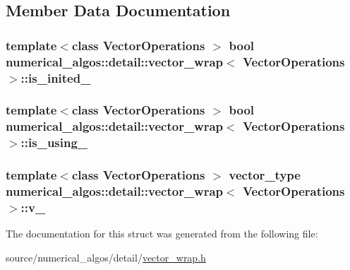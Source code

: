 \subsection{Member Data Documentation}
\hypertarget{structnumerical__algos_1_1detail_1_1vector__wrap_aaf5db6668aeed52bebc8e9679a07be72}{
\subsubsection[{is\-\_\-inited\-\_\-}]{\setlength{\rightskip}{0pt plus 5cm}template$<$class Vector\-Operations $>$ bool {\bf numerical\-\_\-algos\-::detail\-::vector\-\_\-wrap}$<$ Vector\-Operations $>$\-::is\-\_\-inited\-\_\-}}\label{structnumerical__algos_1_1detail_1_1vector__wrap_aaf5db6668aeed52bebc8e9679a07be72}
\hypertarget{structnumerical__algos_1_1detail_1_1vector__wrap_af575530f0c10e653901eaa23b0260b99}{
\subsubsection[{is\-\_\-using\-\_\-}]{\setlength{\rightskip}{0pt plus 5cm}template$<$class Vector\-Operations $>$ bool {\bf numerical\-\_\-algos\-::detail\-::vector\-\_\-wrap}$<$ Vector\-Operations $>$\-::is\-\_\-using\-\_\-}}\label{structnumerical__algos_1_1detail_1_1vector__wrap_af575530f0c10e653901eaa23b0260b99}
\hypertarget{structnumerical__algos_1_1detail_1_1vector__wrap_a70f4e662d62fb5bd7bc48067b4443c56}{
\subsubsection[{v\-\_\-}]{\setlength{\rightskip}{0pt plus 5cm}template$<$class Vector\-Operations $>$ {\bf vector\-\_\-type} {\bf numerical\-\_\-algos\-::detail\-::vector\-\_\-wrap}$<$ Vector\-Operations $>$\-::v\-\_\-}}\label{structnumerical__algos_1_1detail_1_1vector__wrap_a70f4e662d62fb5bd7bc48067b4443c56}


The documentation for this struct was generated from the following file\-:\begin{DoxyCompactItemize}
\item 
source/numerical\-\_\-algos/detail/\hyperlink{vector__wrap_8h}{vector\-\_\-wrap.\-h}\end{DoxyCompactItemize}
